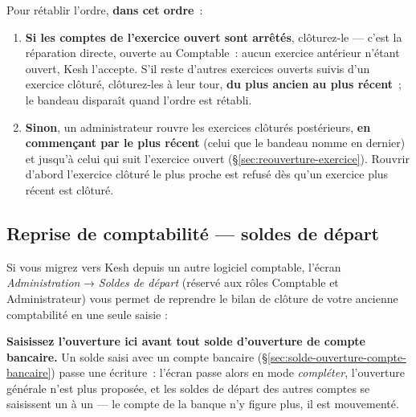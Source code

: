 \documentclass[a4paper,11pt,oneside]{article}
\begin{document}
Pour rétablir l'ordre, \textbf{dans cet ordre}~:

\begin{enumerate}
    \item \textbf{Si les comptes de l'exercice ouvert sont arrêtés}, clôturez-le --- c'est la réparation directe, ouverte au Comptable~: aucun exercice antérieur n'étant ouvert, Kesh l'accepte. S'il reste d'autres exercices ouverts suivis d'un exercice clôturé, clôturez-les à leur tour, \textbf{du plus ancien au plus récent}~; le bandeau disparaît quand l'ordre est rétabli.
    \item \textbf{Sinon}, un administrateur rouvre les exercices clôturés postérieurs, \textbf{en commençant par le plus récent} (celui que le bandeau nomme en dernier) et jusqu'à celui qui suit l'exercice ouvert (\S\ref{sec:reouverture-exercice}). Rouvrir d'abord l'exercice clôturé le plus proche est refusé dès qu'un exercice plus récent est clôturé.
\end{enumerate}

\subsection{Reprise de comptabilité — soldes de départ}\label{sec:soldes-depart}

Si vous migrez vers Kesh depuis un autre logiciel comptable, l'écran \emph{Administration} → \emph{Soldes de départ} (réservé aux rôles Comptable et Administrateur) vous permet de reprendre le bilan de clôture de votre ancienne comptabilité en une seule saisie :

\begin{keshwarning}
\textbf{Saisissez l'ouverture ici avant tout solde d'ouverture de compte bancaire.} Un solde saisi avec un compte bancaire (\S\ref{sec:solde-ouverture-compte-bancaire}) passe une écriture~: l'écran passe alors en mode \emph{compléter}, l'ouverture générale n'est plus proposée, et les soldes de départ des autres comptes se saisissent un à un --- le compte de la banque n'y figure plus, il est mouvementé.
\end{keshwarning}
\end{document}
